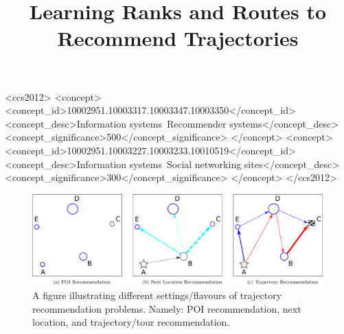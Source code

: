 \documentclass{sig-alternate-05-2015}
\begin{document}

\title{Learning Ranks and Routes to Recommend Trajectories}


\begin{CCSXML}
    <ccs2012>
    <concept>
    <concept_id>10002951.10003317.10003347.10003350</concept_id>
    <concept_desc>Information systems~Recommender systems</concept_desc>
    <concept_significance>500</concept_significance>
    </concept>
    <concept>
    <concept_id>10002951.10003227.10003233.10010519</concept_id>
    <concept_desc>Information systems~Social networking sites</concept_desc>
    <concept_significance>300</concept_significance>
    </concept>
    </ccs2012>
\end{CCSXML}

\maketitle

\begin{abstract}

\end{abstract}




\begin{figure}[tp]
	\centering
	\includegraphics[scale=.7]{fig/fig1-flavours.pdf}
	\caption{A figure illustrating different settings/flavours of trajectory recommendation problems. Namely: POI recommendation, next location, and trajectory/tour recommendation.
}
	\label{fig:problems}
\end{figure}
\end{document}
